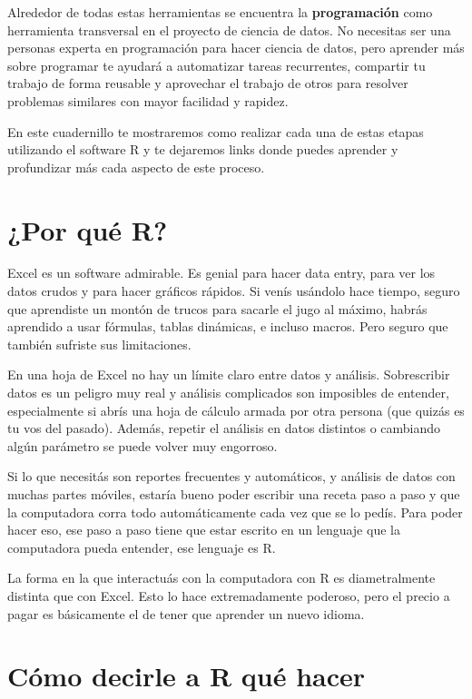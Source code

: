 \documentclass[
  openany]{book}
\begin{document}
Alrededor de todas estas herramientas se encuentra la \textbf{programación} como herramienta transversal en el proyecto de ciencia de datos.
No necesitas ser una personas experta en programación para hacer ciencia de datos, pero aprender más sobre programar te ayudará a automatizar tareas recurrentes, compartir tu trabajo de forma reusable y aprovechar el trabajo de otros para resolver problemas similares con mayor facilidad y rapidez.

En este cuadernillo te mostraremos como realizar cada una de estas etapas utilizando el software R y te dejaremos links donde puedes aprender y profundizar más cada aspecto de este proceso.

\hypertarget{por-quuxe9-r}{%
\section{¿Por qué R?}\label{por-quuxe9-r}}

Excel es un software admirable.
Es genial para hacer data entry, para ver los datos crudos y para hacer gráficos rápidos.
Si venís usándolo hace tiempo, seguro que aprendiste un montón de trucos para sacarle el jugo al máximo, habrás aprendido a usar fórmulas, tablas dinámicas, e incluso macros.
Pero seguro que también sufriste sus limitaciones.

En una hoja de Excel no hay un límite claro entre datos y análisis.
Sobrescribir datos es un peligro muy real y análisis complicados son imposibles de entender, especialmente si abrís una hoja de cálculo armada por otra persona (que quizás es tu vos del pasado).
Además, repetir el análisis en datos distintos o cambiando algún parámetro se puede volver muy engorroso.

Si lo que necesitás son reportes frecuentes y automáticos, y análisis de datos con muchas partes móviles, estaría bueno poder escribir una receta paso a paso y que la computadora corra todo automáticamente cada vez que se lo pedís.
Para poder hacer eso, ese paso a paso tiene que estar escrito en un lenguaje que la computadora pueda entender, ese lenguaje es R.

La forma en la que interactuás con la computadora con R es diametralmente distinta que con Excel.
Esto lo hace extremadamente poderoso, pero el precio a pagar es básicamente el de tener que aprender un nuevo idioma.

\hypertarget{cuxf3mo-decirle-a-r-quuxe9-hacer}{%
\section{Cómo decirle a R qué hacer}\label{cuxf3mo-decirle-a-r-quuxe9-hacer}}
\end{document}
